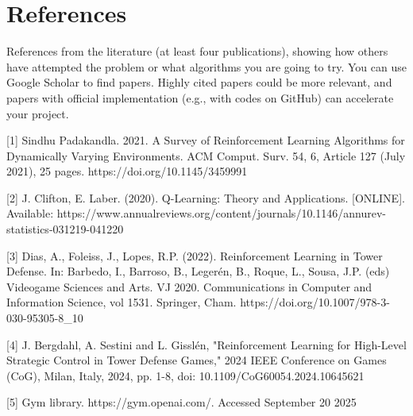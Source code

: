\documentclass[12pt]{article}
\begin{document}
\section{References}
References from the literature (at least four publications), showing how others have attempted the problem or what algorithms you are going to try. You can use Google Scholar to find papers. Highly cited papers could be more relevant, and papers with official implementation (e.g., with codes on GitHub) can accelerate your project. \par

[1] Sindhu Padakandla. 2021. A Survey of Reinforcement Learning Algorithms for Dynamically Varying Environments. ACM Comput. Surv. 54, 6, Article 127 (July 2021), 25 pages.
https://doi.org/10.1145/3459991 \par

[2] J. Clifton, E. Laber. (2020). Q-Learning: Theory and Applications. [ONLINE]. Available: https://www.annualreviews.org/content/journals/10.1146/annurev-statistics-031219-041220 \par

[3] Dias, A., Foleiss, J., Lopes, R.P. (2022). Reinforcement Learning in Tower Defense. In: Barbedo, I., Barroso, B., Legerén, B., Roque, L., Sousa, J.P. (eds) Videogame Sciences and Arts. VJ 2020. Communications in Computer and Information Science, vol 1531. Springer, Cham. https://doi.org/10.1007/978-3-030-95305-8\_10 \par 

[4] J. Bergdahl, A. Sestini and L. Gisslén, "Reinforcement Learning for High-Level Strategic Control in Tower Defense Games," 2024 IEEE Conference on Games (CoG), Milan, Italy, 2024, pp. 1-8, doi: 10.1109/CoG60054.2024.10645621 \par

[5] Gym library. https://gym.openai.com/. Accessed September 20 2025
\end{document}
